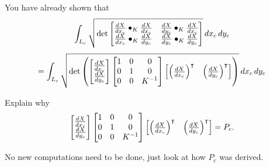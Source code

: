 \documentclass{ximera}
\begin{document}
You have already shown that
\[
\int_{L_c} \sqrt{
  \det
  \begin{bmatrix}
    \dd[X]{x_c}\bullet_K \dd[X]{x_c} & \dd[X]{y_c}\bullet_K \dd[X]{x_c} \\
    \dd[X]{x_c}\bullet_K \dd[X]{y_c} & \dd[X]{y_c}\bullet_K \dd[X]{y_c}
  \end{bmatrix}
}\d x_c\d y_c
\]
\[
=
\int_{L_c} \sqrt{
  \det\left(
  \begin{bmatrix}
    \dd[X]{x_c}\\
    \dd[X]{y_c}
  \end{bmatrix}
  \begin{bmatrix}
    1 & 0 & 0\\
    0 & 1 & 0\\
    0 & 0 & K^{-1}
  \end{bmatrix}
  \begin{bmatrix}
    \left(\dd[X]{x_c}\right)^\transpose & \left(\dd[X]{y_c}\right)^\transpose
  \end{bmatrix}\right)
}\d x_c\d y_c
\]

\begin{problem}
  Explain why
  \[
\begin{bmatrix}
    \dd[X]{x_c}\\
    \dd[X]{y_c}
  \end{bmatrix}
  \begin{bmatrix}
    1 & 0 & 0\\
    0 & 1 & 0\\
    0 & 0 & K^{-1}
  \end{bmatrix}
  \begin{bmatrix}
    \left(\dd[X]{x_c}\right)^\transpose & \left(\dd[X]{y_c}\right)^\transpose
  \end{bmatrix} =P_c.
  \]
  \begin{hint}
    No new computations need to be done, just look at how $P_c$ was derived.
  \end{hint}
\end{problem}
\end{document}
